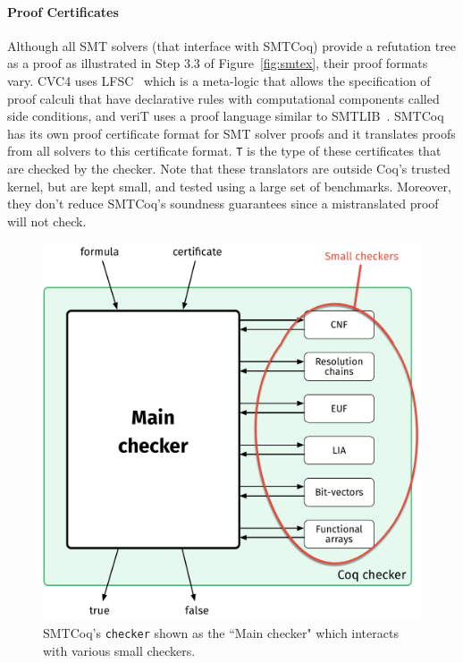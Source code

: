 \documentclass[11pt]{article}
\begin{document}
	\paragraph{Proof Certificates} Although all 
	SMT solvers (that 
	interface with SMTCoq) provide a
	refutation tree as a proof as 
	illustrated in Step 3.3 of 
	Figure~\ref{fig:smtex},
	their proof formats vary. CVC4 uses 
	LFSC~\cite{DBLP:journals/fmsd/StumpORHT13}
	which is a meta-logic that allows the 
	specification of proof calculi that have 
	declarative	rules with computational 
	components called side conditions, and 
	veriT uses a proof language similar to 
	SMTLIB~\cite{Besson1}. SMTCoq has its 
	own proof certificate format for SMT 
	solver proofs and it translates proofs 
	from all solvers to this certificate 
	format. \texttt{T} is the type of 
	these certificates that are 
	checked by the checker. Note 
	that these translators are outside 
	Coq's trusted kernel, but are kept
	small, and tested using a large 
	set of benchmarks. Moreover, they
	don't reduce SMTCoq's soundness
	guarantees since a mistranslated
	proof will not check.
	
	\begin{figure}[t]
		\begin{center}
			\includegraphics[scale=0.3]{checker}
			\caption{SMTCoq's \texttt{checker}
				shown as the ``Main checker" which 
				interacts with various small checkers.}
			\label{fig:checker}
		\end{center}
	\end{figure}
	
\end{document}
